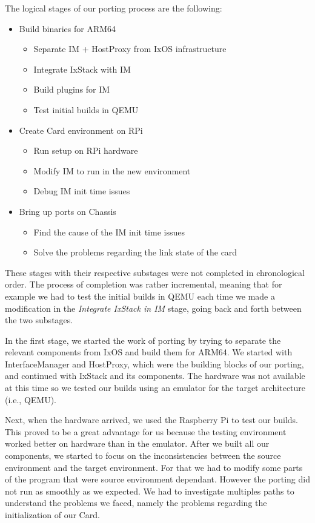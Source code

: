 The logical stages of our porting process are the following:
\begin{itemize}
    \item Build binaries for ARM64
    \begin{itemize}
        \item Separate IM + HostProxy from IxOS infrastructure
        \item Integrate IxStack with IM
        \item Build plugins for IM
        \item Test initial builds in QEMU
    \end{itemize}
    \item Create Card environment on RPi
    \begin{itemize}
        \item Run setup on RPi hardware
        \item Modify IM to run in the new environment
        \item Debug IM init time issues
    \end{itemize}
    \item Bring up ports on Chassis
    \begin{itemize}
        \item Find the cause of the IM init time issues
        \item Solve the problems regarding the link state of the card
    \end{itemize}
\end{itemize}
These stages with their respective substages were not completed in chronological
order. The process of completion was rather incremental, meaning that for
example we had to test the initial builds in QEMU each time we made a
modification in the \textit{Integrate IxStack in IM} stage, going back and forth
between the two substages.

In the first stage, we started the work of porting by trying to separate the
relevant components from IxOS and build them for ARM64. We started with
InterfaceManager and HostProxy, which were the building blocks of our porting,
and continued with IxStack and its components. The hardware was not available
at this time so we tested our builds using an emulator for the target
architecture (i.e., QEMU).

Next, when the hardware arrived, we used the Raspberry Pi to test our builds.
This proved to be a great advantage for us because the testing environment
worked better on hardware than in the emulator. After we built all our
components, we started to focus on the inconsistencies between the source
environment and the target environment. For that we had to modify some parts of
the program that were source environment dependant. However the porting did not
run as smoothly as we expected. We had to investigate multiples paths to
understand the problems we faced, namely the problems regarding the
initialization of our Card.

